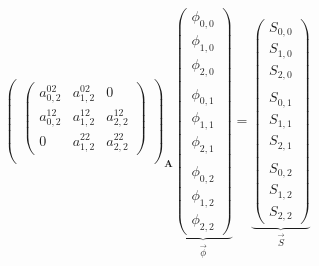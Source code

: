 \documentclass[12pt]{article}
\newcommand{\ve}[1]{\ensuremath{\mathbf{#1}}}
\begin{document}
\begin{equation}
{\begin{pmatrix}
\begin{pmatrix}
a_{0,2}^{02} & a_{1,2}^{02} & 0 \\
a_{0,2}^{12} & a_{1,2}^{12} & a_{2,2}^{12} \\
0            & a_{1,2}^{22} & a_{2,2}^{22}
\end{pmatrix} \\
\end{pmatrix}}_{\ve{A}}
%
\underbrace{\begin{pmatrix} \phi_{0,0} \\ \phi_{1,0} \\ \phi_{2,0} \\ \\ \phi_{0,1} \\ \phi_{1,1} \\ \phi_{2,1} \\ \\ \phi_{0,2}\\ \phi_{1,2} \\  \phi_{2,2} \end{pmatrix}}_{\vec{\phi}} =
%
\underbrace{\begin{pmatrix} S_{0,0} \\ S_{1,0} \\ S_{2,0} \\ \\ S_{0,1} \\ S_{1,1} \\ S_{2,1} \\ \\ S_{0,2} \\ S_{1,2} \\  S_{2,2} \end{pmatrix}}_{\vec{S}} \nonumber
\end{equation}
\end{document}
